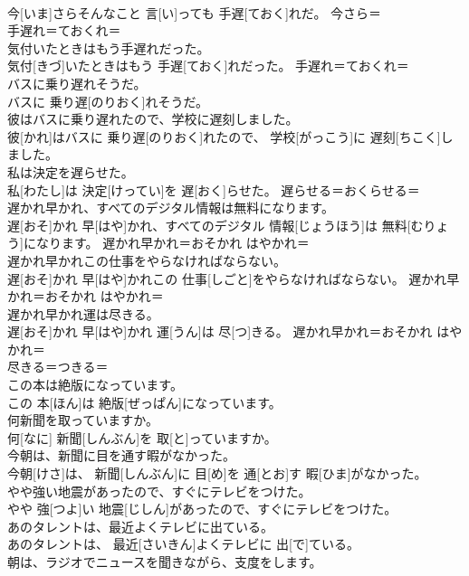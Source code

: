 \documentclass[8pt]{extreport}
\begin{document}
\begin{CJK}{UTF8}{min}
\\	今[いま]さらそんなこと 言[い]っても 手遅[ておく]れだ。	今さら＝ 
\\	手遅れ＝ておくれ＝ 
\\	気付いたときはもう手遅れだった。	
\\	気付[きづ]いたときはもう 手遅[ておく]れだった。	手遅れ＝ておくれ＝ 
\\	バスに乗り遅れそうだ。	
\\	バスに 乗り遅[のりおく]れそうだ。	
\\	彼はバスに乗り遅れたので、学校に遅刻しました。	
\\	彼[かれ]はバスに 乗り遅[のりおく]れたので、 学校[がっこう]に 遅刻[ちこく]しました。	
\\	私は決定を遅らせた。	
\\	私[わたし]は 決定[けってい]を 遅[おく]らせた。	遅らせる＝おくらせる＝ 
\\	遅かれ早かれ、すべてのデジタル情報は無料になります。	
\\	遅[おそ]かれ 早[はや]かれ、すべてのデジタル 情報[じょうほう]は 無料[むりょう]になります。	遅かれ早かれ＝おそかれ はやかれ＝ 
\\	遅かれ早かれこの仕事をやらなければならない。	
\\	遅[おそ]かれ 早[はや]かれこの 仕事[しごと]をやらなければならない。	遅かれ早かれ＝おそかれ はやかれ＝ 
\\	遅かれ早かれ運は尽きる。	
\\	遅[おそ]かれ 早[はや]かれ 運[うん]は 尽[つ]きる。	遅かれ早かれ＝おそかれ はやかれ＝ 
\\	尽きる＝つきる＝ 
\\	この本は絶版になっています。	
\\	この 本[ほん]は 絶版[ぜっぱん]になっています。	
\\	何新聞を取っていますか。	
\\	何[なに] 新聞[しんぶん]を 取[と]っていますか。	
\\	今朝は、新聞に目を通す暇がなかった。	
\\	今朝[けさ]は、 新聞[しんぶん]に 目[め]を 通[とお]す 暇[ひま]がなかった。	
\\	やや強い地震があったので、すぐにテレビをつけた。	
\\	やや 強[つよ]い 地震[じしん]があったので、すぐにテレビをつけた。	
\\	あのタレントは、最近よくテレビに出ている。	
\\	あのタレントは、 最近[さいきん]よくテレビに 出[で]ている。	
\\	朝は、ラジオでニュースを聞きながら、支度をします。	

\end{CJK}
\end{document}
